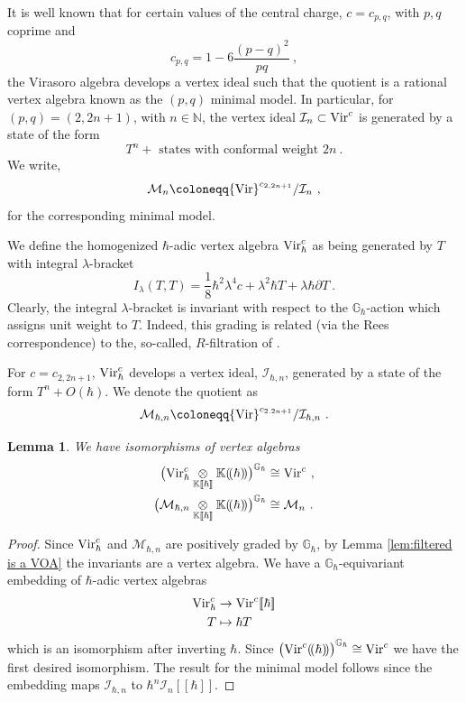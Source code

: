 \documentclass[11pt]{amsart}
\numberwithin{equation}{section}
\newtheorem{lemma}[theo]{Lemma}
\theoremstyle{definition}
\newcommand{\bb}{\mathbb}
\newcommand{\mc}{\mathcal}
\newcommand{\ik}{{\bb K}}
\newcommand{\Vir}{{\textup{Vir}}}
\newcommand{\0}{{\textbf{0}}}
\newcommand{\MM}{{\textbf{M}}}
\newcommand{\del}{{{\partial}}}
\def\IN{\mathbb{N}}
\def\IG{\mathbb{G}}
\def\II{{\mc I}}
\def\MM{{\mc M}}
\newcommand{\tensor}[1]{\underset{#1}{\otimes}}
\begin{document}
It is well known that for certain values of the central charge, $c = c_{p,q}$, with $p,q$ coprime and 
\[
c_{p,q} = 1 - 6\frac{(p-q)^2}{pq}~,
\]
the Virasoro algebra develops a vertex ideal such that the quotient is a rational vertex algebra known as the $(p,q)$ minimal model. In particular, for $(p,q)=(2,2n+1)$, with $n\in \IN$, the vertex ideal $\II_n\subset \Vir^c$ is generated by a state of the form
\[ 
T^n + \text{ states with conformal weight } 2n~.
\]
We write, 
\[
\MM_n \coloneqq \Vir^{c_{2,2n+1}} /\II_n~,
\]
for the corresponding minimal model. 

We define the homogenized $\hbar$-adic vertex algebra $\Vir^c_{\hbar}$ as being generated by $T$ with integral $\lambda$-bracket
\[
I_\lambda(T,T)= \frac{1}{8}\hbar ^2\lambda^4 c + \lambda^2 \hbar T + \lambda \hbar \del T~.
\]
Clearly, the integral $\lambda$-bracket is invariant with respect to the $\IG_\hbar$-action which assigns unit weight to $T$. Indeed, this grading is related (via the Rees correspondence) to the, so-called, $R$-filtration of \cite{ArabiArdehali:2025fad}.

For $c= c_{2,2n+1}$, $\Vir^c_{\hbar}$ develops a vertex ideal, $\II_{\hbar,n}$, generated by a state of the form $T^n + O(\hbar)$. We denote the quotient as
\[
\MM_{\hbar,n} \coloneqq \Vir^{c_{2.2n+1}}/ \II_{\hbar,n}~.
\]

\begin{lemma}\label{lem:filtered version of Virasoro}
	We have isomorphisms of vertex algebras
	\begin{equation}
		\begin{split}
		\big(\Vir^c_{\hbar}\tensor{\ik[\![\hbar]\!]}\ik(\!(\hbar)\!)\big)^{\IG_\hbar} &\cong \Vir^c~,\\
		\big(\MM_{\hbar,n}\tensor{\ik[\![\hbar]\!]}\ik(\!(\hbar)\!)\big)^{\IG_\hbar} &\cong \MM_n~.
		\end{split}
	\end{equation}
\end{lemma}
\begin{proof}
	Since $\Vir^c_\hbar$ and $\MM_{\hbar,n}$ are positively graded by $\IG_\hbar$, by Lemma \ref{lem:filtered is a VOA} the invariants are a vertex algebra. We have a $\IG_\hbar$-equivariant embedding of $\hbar$-adic vertex algebras
	\begin{equation}
	\begin{split}
		\Vir^c_\hbar &\rightarrow \Vir^c[\![\hbar]\!] \\
		T &\mapsto \hbar T
	\end{split}
	\end{equation}
	which is an isomorphism after inverting $\hbar$. Since $\big(\Vir^c(\!(\hbar)\!)\big)^{\IG_\hbar}\cong \Vir^c$ we have the first desired isomorphism. The result for the minimal model follows since the embedding maps $\II_{\hbar,n}$ to $\hbar^n\II_n[\![\hbar]\!]$.
\end{proof}
\end{document}

